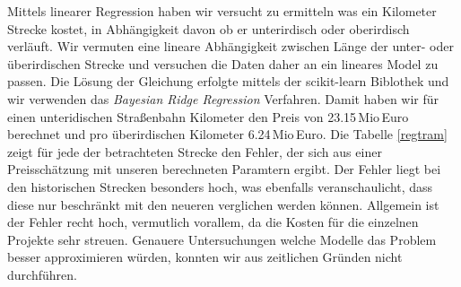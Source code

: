 Mittels linearer Regression haben wir versucht zu ermitteln was ein Kilometer Strecke kostet, in Abhängigkeit davon ob er unterirdisch oder oberirdisch verläuft. Wir vermuten eine lineare Abhängigkeit zwischen Länge der unter- oder überirdischen Strecke und versuchen die Daten daher an ein lineares Model zu passen. Die Lösung der Gleichung erfolgte mittels der scikit-learn Biblothek und wir verwenden das \emph{ Bayesian Ridge Regression} Verfahren. Damit haben wir für einen unteridischen Straßenbahn Kilometer den Preis von 23.15\,Mio\,Euro berechnet und pro überirdischen Kilometer 6.24\,Mio\,Euro. Die Tabelle \ref{regtram} zeigt für jede der betrachteten Strecke den Fehler, der sich aus einer Preisschätzung mit unseren berechneten Paramtern ergibt. Der Fehler liegt bei den historischen Strecken besonders hoch, was ebenfalls veranschaulicht, dass diese nur beschränkt mit den neueren verglichen werden können. Allgemein ist der Fehler recht hoch, vermutlich vorallem, da die Kosten für die einzelnen Projekte sehr streuen. Genauere Untersuchungen welche Modelle das Problem besser approximieren würden, konnten wir aus zeitlichen Gründen nicht durchführen.

\enlargethispage{1cm}
